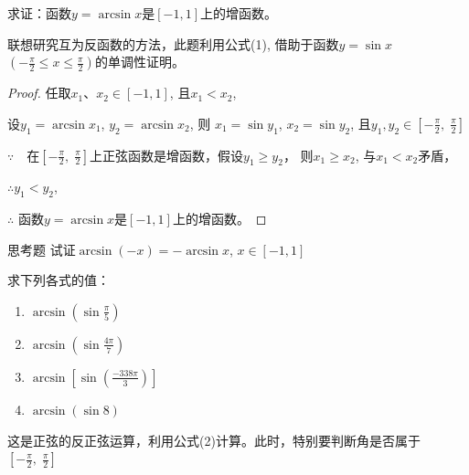 \begin{example}
    求证：函数$y=\arcsin x$是$[-1,1]$上的增函数。
\end{example}

\begin{analyze}
    联想研究互为反函数的方法，此题利用公式(1), 借助于函数$y=\sin x$ $\left(-\frac{\pi}{2}\leq x\leq\frac{\pi}{2}\right)$的单调性证明。
\end{analyze}

\begin{proof}
    任取$x_1$、$x_2\in[-1,1]$, 且$x_1<x_2$,

    设$y_{1}= \arcsin x_{1}$, $y_{2}= \arcsin x_{2}$,
则 $x_{1}= \sin y_{1}$, $x_{2}= \sin y_{2}$, 且$y_1, y_{2}\in \left [ - \frac \pi 2, \;\frac \pi 2\right ] $

$\because\quad $在$\left[-\frac\pi2,\; \frac\pi2\right]$上正弦函数是增函数，假设$y_1\ge y_2$，
则$x_1\geqslant x_2$, 与$x_1<x_2$矛盾，

$\therefore y_{1}<y_{2}$,

$\therefore$ 函数$y=\arcsin x$是$[-1,1]$上的增函数。
\end{proof}

\begin{thm}
 {思考题} 试证$\arcsin(-x)=-\arcsin x$, $x\in[-1,1]$   
\end{thm}

\begin{example}
    求下列各式的值：
\begin{multicols}{2}
\begin{enumerate}[(1)]
    \item $\arcsin \left(\sin\frac{\pi}{5}\right)$
    \item $\arcsin \left(\sin\frac{4\pi}{7}\right)$
    \item $\arcsin \left[\sin\left(\frac{-338\pi}{3}\right)\right]$
    \item $\arcsin (\sin 8)$
\end{enumerate}
\end{multicols}
\end{example}

\begin{analyze}
 这是正弦的反正弦运算，利用公式(2)计算。此时，特别要判断角是否属于$\left[-\frac{\pi}{2},\; \frac{\pi}{2}\right]$
\end{analyze}

